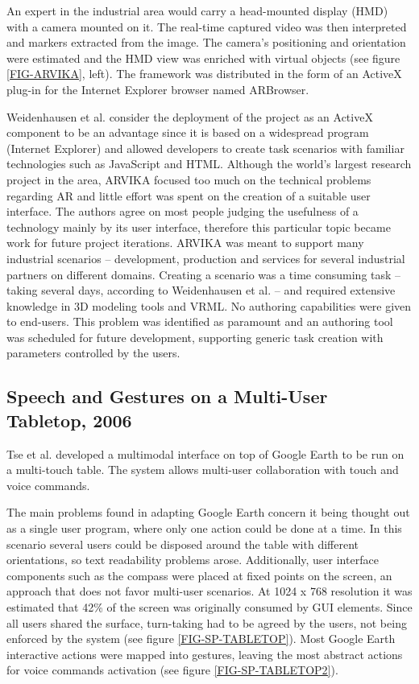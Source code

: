 An expert in the industrial area would carry a head-mounted display (HMD) with a camera mounted on it.
The real-time captured video was then interpreted and markers extracted from the image.
The camera's positioning and orientation were estimated and the HMD view was enriched with virtual objects
(see figure \ref{FIG-ARVIKA}, left).
The framework was distributed in the form of an ActiveX plug-in for the Internet Explorer browser
named ARBrowser.


Weidenhausen et al. \cite{ARVIKA-LESSONS} consider the deployment of the project as an ActiveX component
to be an advantage since it is based on a widespread program (Internet Explorer) and allowed developers
to create task scenarios with familiar technologies such as JavaScript and HTML.
Although the world's largest research project in the area, ARVIKA focused too much on the technical problems
regarding AR and little effort was spent on the creation of a suitable user interface.
The authors agree on most people judging the usefulness of a technology mainly by its user interface,
therefore this particular topic became work for future project iterations.
ARVIKA was meant to support many industrial scenarios -- development, production and services for several
industrial partners on different domains.
Creating a scenario was a time consuming task -- taking several days, according to Weidenhausen et al.
-- and required extensive knowledge in 3D modeling tools and VRML. No authoring capabilities were given to end-users.
This problem was identified as paramount and an authoring tool was scheduled for future development,
supporting generic task creation with parameters controlled by the users.



\subsection{Speech and Gestures on a Multi-User Tabletop, 2006}

Tse et al. \cite{SP-GEST-TTOP} developed a multimodal interface on top of Google Earth \cite{SITE-EARTH}
to be run on a multi-touch table.
The system allows multi-user collaboration with touch and voice commands.

The main problems found in adapting Google Earth concern it being thought out as a single user program,
where only one action could be done at a time.
In this scenario several users could be disposed around the table with different orientations,
so text readability problems arose.
Additionally, user interface components such as the compass were placed at fixed points on the screen,
an approach that does not favor multi-user scenarios.
At 1024 x 768 resolution it was estimated that 42\% of the screen was originally consumed by GUI elements.
Since all users shared the surface, turn-taking had to be agreed by the users,
not being enforced by the system (see figure \ref{FIG-SP-TABLETOP}).
Most Google Earth interactive actions were mapped into gestures,
leaving the most abstract actions for voice commands activation (see figure \ref{FIG-SP-TABLETOP2}).


